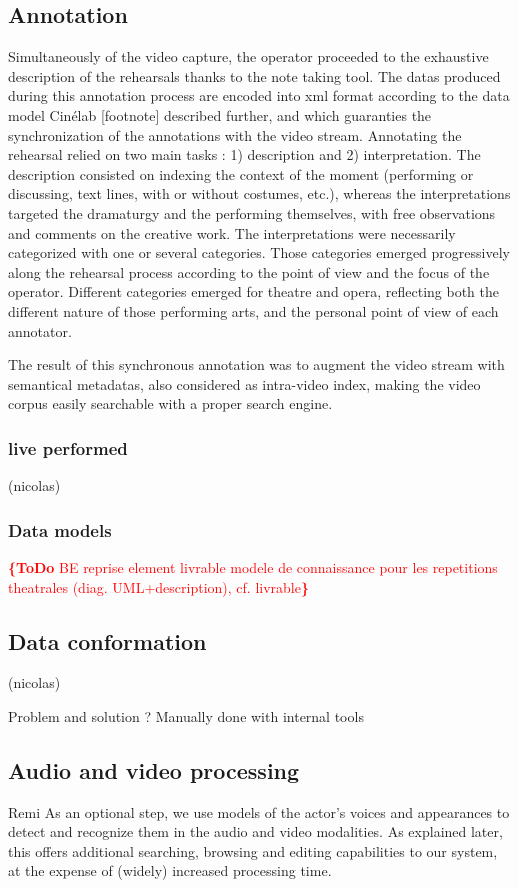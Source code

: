\documentclass[conference]{IEEEtran}
\newcommand{\todo}[1]{\noindent\textcolor{red}{{\bf \{ToDo} #1{\bf \}}}}
\begin{document}
\subsection{Annotation}
Simultaneously of the video capture, the operator proceeded to the exhaustive description of the rehearsals thanks to the note taking tool. The datas produced during this annotation process are encoded into xml format according to the data model Cinélab [footnote] described further, and which guaranties the synchronization of the annotations with the video stream. 
Annotating the rehearsal relied on two main tasks : 1) description and 2) interpretation. The description consisted on indexing the context of the moment (performing or discussing, text lines, with or without costumes, etc.), whereas the interpretations targeted the dramaturgy and the performing themselves, with free observations and comments on the creative work. The interpretations were necessarily categorized with one or several categories. Those categories emerged progressively along the rehearsal process according to the point of view and the focus of the operator. 
Different categories emerged for theatre and opera, reflecting both the different nature of those performing arts, and the personal point of view of each annotator.

The result of this synchronous annotation was to augment the video stream with semantical metadatas, also considered as intra-video index, making the video corpus easily searchable with a proper search engine.
\subsubsection{live performed} (nicolas)

\subsubsection{Data models}
\todo{BE reprise element livrable modele de connaissance pour les repetitions theatrales (diag. UML+description), cf. livrable}

\subsection{Data conformation} (nicolas)

Problem and solution ? Manually done with internal tools

\subsection{Audio and video processing} Remi
As an optional step, we use models of  the actor's voices and appearances to detect and recognize them
in the audio and video modalities. As explained later, this offers additional searching, browsing and editing capabilities
to our system, at the expense of (widely) increased processing time.
\end{document}
